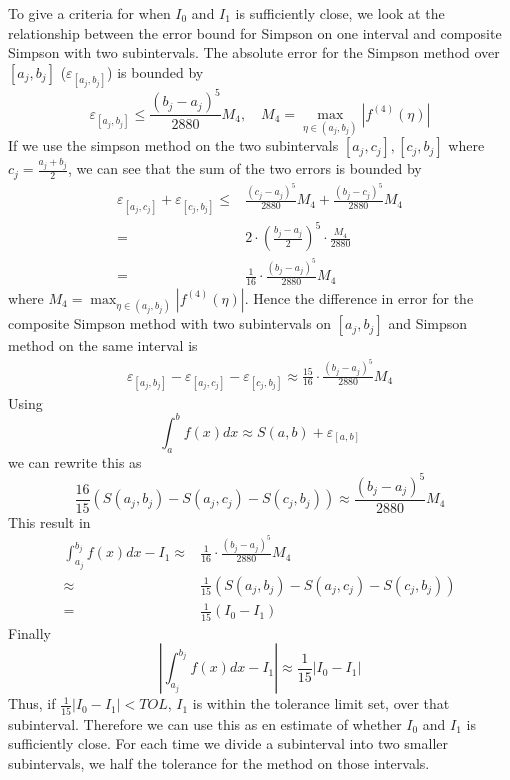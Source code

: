 \documentclass[12pt, a4paper,usenames,dvipsnames]{article}
\begin{document}
To give a criteria for when \(I_0\) and \(I_1\) is sufficiently close, we look at the relationship between the error bound for Simpson on one interval and composite Simpson with two subintervals. The absolute error for the Simpson method over \([a_j,b_j]\) (\(\varepsilon_{[a_j,b_j]}\)) is bounded by 
\[\varepsilon_{[a_j,b_j]}\leq \frac{(b_j-a_j)^5}{2880}M_4,\quad M_4=\max_{\eta\in(a_j,b_j)}|f^{(4)}(\eta)|\]
If we use the simpson method on the two subintervals \([a_j,c_j],[c_j,b_j]\) where \(c_j=\frac{a_j+b_j}{2}\), we can see that the sum of the two errors is bounded by 
\begin{equation*}
    \begin{split}
        \varepsilon_{[a_j,c_j]}+\varepsilon_{[c_j,b_j]}\leq& \frac{(c_j-a_j)^5}{2880}M_4+\frac{(b_j-c_j)^5}{2880}M_4\\
        =&2\cdot\left(\frac{b_j-a_j}{2}\right)^5\cdot\frac{M_4}{2880}\\
        =&\frac{1}{16}\cdot\frac{(b_j-a_j)^5}{2880}M_4
    \end{split}
\end{equation*}
where \(M_4=\max_{\eta \in (a_j,b_j)}|f^{(4)}(\eta)|\). Hence the difference in error for the composite Simpson method with two subintervals on \([a_j,b_j]\) and Simpson method on the same interval is
\begin{equation*}
    \begin{split}
        \varepsilon_{[a_j,b_j]}-\varepsilon_{[a_j,c_j]}-\varepsilon_{[c_j,b_j]}\approx \frac{15}{16}\cdot\frac{(b_j-a_j)^5}{2880}M_4
    \end{split}
\end{equation*}
Using 
\[\int_a^bf(x)dx\approx S(a,b)+\varepsilon_{[a,b]}\]
we can rewrite this as
\[\frac{16}{15}\left(S(a_j,b_j)-S(a_j,c_j)-S(c_j,b_j)\right)\approx\frac{(b_j-a_j)^5}{2880}M_4\]
This result in
\begin{equation*}
    \begin{split}
        \int_{a_j}^{b_j}f(x)dx-I_1\approx&\frac{1}{16}\cdot\frac{(b_j-a_j)^5}{2880}M_4\\
         \approx&\frac{1}{15}\left(S(a_j,b_j)-S(a_j,c_j)-S(c_j,b_j)\right)\\
         =&\frac{1}{15}(I_0-I_1)
    \end{split}
\end{equation*}
Finally
\[\left|\int_{a_j}^{b_j}f(x)dx-I_1\right|\approx\frac{1}{15}\left|I_0-I_1\right|\]
Thus, if \(\frac{1}{15}|I_0-I_1|<TOL\), \(I_1\) is within the tolerance limit set, over that subinterval. Therefore we can use this as en estimate of whether \(I_0\) and \(I_1\) is sufficiently close. For each time we divide a subinterval into two smaller subintervals, we half the tolerance for the method on those intervals.  
\end{document}

